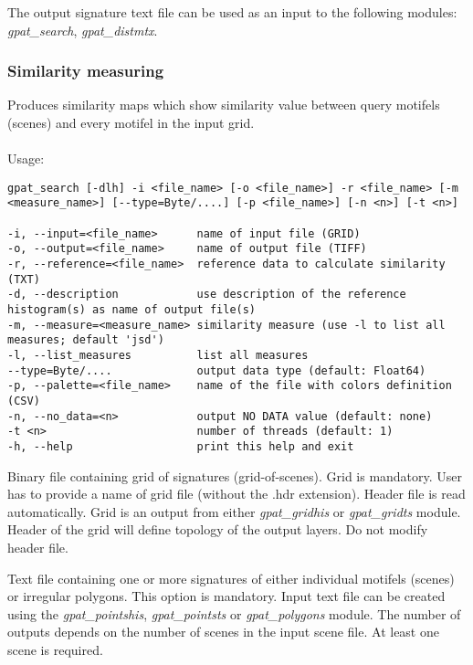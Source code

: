 The output signature text file can be used as an input to the following modules: {\it gpat\_search}, {\it gpat\_distmtx}.

\subsubsection{Similarity measuring}

Produces similarity maps which show similarity value between query motifels (scenes) and every motifel in the input grid.
\\\\
Usage:

\begin{minipage}{\linewidth}
\begin{lstlisting}
gpat_search [-dlh] -i <file_name> [-o <file_name>] -r <file_name> [-m <measure_name>] [--type=Byte/....] [-p <file_name>] [-n <n>] [-t <n>]

-i, --input=<file_name>      name of input file (GRID)
-o, --output=<file_name>     name of output file (TIFF)
-r, --reference=<file_name>  reference data to calculate similarity (TXT)
-d, --description            use description of the reference histogram(s) as name of output file(s)
-m, --measure=<measure_name> similarity measure (use -l to list all measures; default 'jsd')
-l, --list_measures          list all measures
--type=Byte/....             output data type (default: Float64)
-p, --palette=<file_name>    name of the file with colors definition (CSV)
-n, --no_data=<n>            output NO DATA value (default: none)
-t <n>                       number of threads (default: 1)
-h, --help                   print this help and exit
\end{lstlisting}
\end{minipage}


Binary file containing grid of signatures (grid-of-scenes). 
Grid is mandatory. 
User has to provide a name of grid file (without the .hdr extension). 
Header file is read automatically. 
Grid is an output from either {\it gpat\_gridhis} or {\it gpat\_gridts} module. 
Header of the grid will define topology of the output layers. 
Do not modify header file.



Text file containing one or more signatures of either individual motifels (scenes) or irregular polygons. 
This option is mandatory. 
Input text file can be created using the {\it gpat\_pointshis}, {\it gpat\_pointsts} or {\it gpat\_polygons} module. 
The number of outputs depends on the number of scenes in the input scene file. 
At least one scene is required. 

